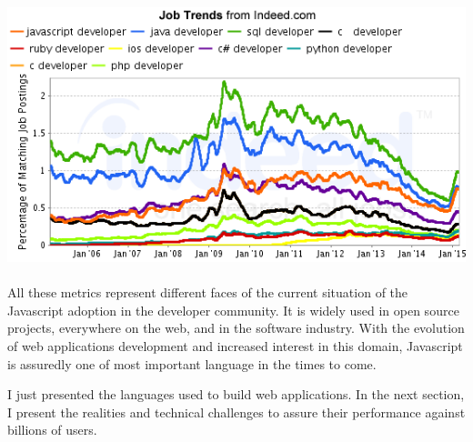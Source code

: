 \includegraphics[width=0.9\linewidth]{../../data/js-trends/jobgraph}

\paragraph{}

All these metrics represent different faces of the current situation of the Javascript adoption in the developer community.
It is widely used in open source projects, everywhere on the web, and in the software industry.
With the evolution of web applications development and increased interest in this domain, Javascript is assuredly one of most important language in the times to come.

I just presented the languages used to build web applications.
In the next section, I present the realities and technical challenges to assure their performance against billions of users.